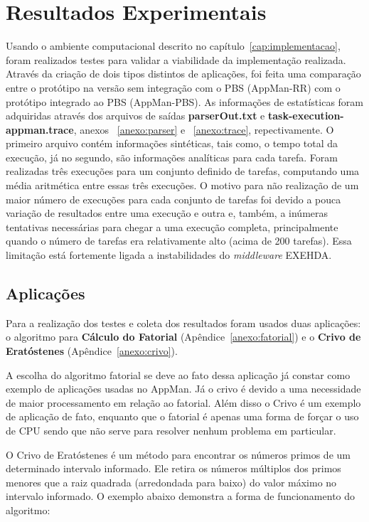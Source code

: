 \chapter{Resultados Experimentais}
\label{cap:resultados}

Usando o ambiente computacional descrito no capítulo~\ref{cap:implementacao}, foram realizados testes para validar a viabilidade da implementação realizada. Através da criação de dois tipos distintos de aplicações, foi feita uma comparação entre o protótipo na versão sem integração com o PBS (AppMan-RR) com o protótipo integrado ao PBS (AppMan-PBS). As informações de estatísticas foram adquiridas através dos arquivos de saídas {\bf parserOut.txt} e {\bf task-execution-appman.trace}, anexos ~\ref{anexo:parser} e ~\ref{anexo:trace}, repectivamente. O primeiro arquivo contém informações sintéticas, tais como, o tempo total da execução, já no segundo, são informações analíticas para cada tarefa. Foram realizadas três execuções para um conjunto definido de tarefas, computando uma média aritmética entre essas três execuções. O motivo para não realização de um maior número de execuções para cada conjunto de tarefas foi devido a pouca variação de resultados entre uma execução e outra e, também, a inúmeras tentativas necessárias para chegar a uma execução completa, principalmente quando o número de tarefas era relativamente alto (acima de 200 tarefas). Essa limitação está fortemente ligada a instabilidades do \emph{middleware} EXEHDA.

\section{Aplicações}

Para a realização dos testes e coleta dos resultados foram usados duas aplicações: o algoritmo para \textbf{Cálculo do Fatorial} (Apêndice~\ref{anexo:fatorial}) e o \textbf{Crivo de Eratóstenes} (Apêndice~\ref{anexo:crivo}).

A escolha do algoritmo fatorial se deve ao fato dessa aplicação já constar como exemplo de aplicações usadas no AppMan. Já o crivo é devido a uma necessidade de maior processamento em relação ao fatorial. Além disso o Crivo é um exemplo de aplicação de fato, enquanto que o fatorial é apenas uma forma de forçar o uso de CPU sendo que não serve para resolver nenhum problema em particular.


O Crivo de Eratóstenes é um método para encontrar os números primos de um determinado intervalo informado. Ele retira os números múltiplos dos primos menores que a raiz quadrada (arredondada para baixo) do valor máximo no intervalo informado. O exemplo abaixo demonstra a forma de funcionamento do algoritmo:

